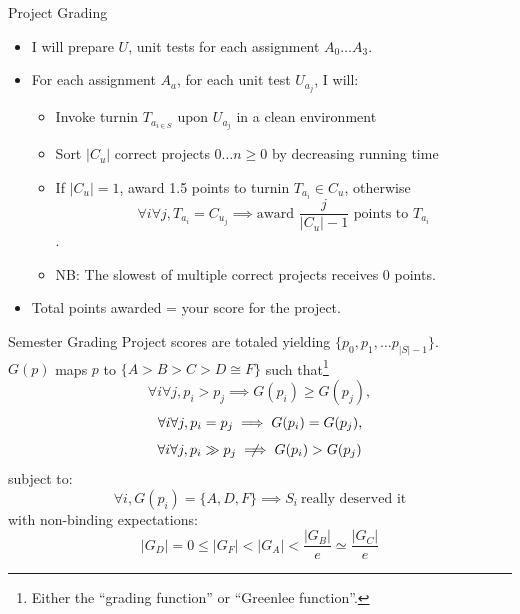 \documentclass{beamer}
\begin{document}
\begin{frame}{Project Grading}
\begin{itemize}
\item I will prepare $U$, unit tests for each assignment $A_0 \dotsc A_3$.
\item For each assignment $A_a$, for each unit test $U_{a_j}$, I will:
\begin{itemize}
\item Invoke turnin $T_{a_{i \in S}}$ upon $U_{a_j}$ in a clean environment
\item Sort $|C_u|$ correct projects $0 \dotsc n\ge 0$ by decreasing running time
\item If $|C_u| = 1$, award 1.5 points to turnin $T_{a_i} \in C_u$, otherwise
\begin{equation}
\forall i \forall j, T_{a_i} = C_{u_j} \implies \text{award } \frac{j}{|C_u| - 1} \text{ points to } T_{a_i}
\nonumber
\end{equation}.
\item NB: The slowest of multiple correct projects receives 0 points.
\end{itemize}
\item Total points awarded = your score for the project.
\end{itemize}
\end{frame}

\begin{frame}{Semester Grading}
Project scores are totaled yielding $\{p_0, p_1, \dotsc p_{|S| - 1}\}$.\linebreak \\
$G(p)$ maps $p$ to $\{A > B > C > D \cong F\}$ such that\footnote{Either the ``grading function'' or ``Greenlee function''.}
\begin{equation}
\forall i \forall j, p_i > p_j \implies G(p_i) \ge G(p_j), \nonumber
\end{equation}
\begin{equation}
\forall i \forall j, p_i = p_j \implies G(p_i) = G(p_j), \nonumber \linebreak
\end{equation}
\begin{equation}
\forall i \forall j, p_i\gg p_j \centernot\implies G(p_i) > G(p_j) \nonumber
\end{equation}
subject to:
\begin{equation}
\forall i, G(p_i) = \{A, D, F\} \implies S_i\ \text{really deserved it}\nonumber
\end{equation}
with non-binding expectations:
\begin{equation}
|G_D| = 0 \le |G_F| < |G_A| < \frac{|G_B|}{e} \simeq \frac{|G_C|}{e} \nonumber
\end{equation}
\end{frame}
\end{document}
